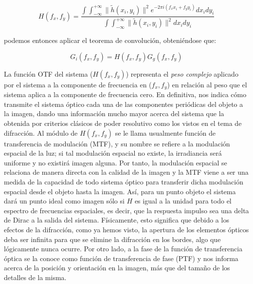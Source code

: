 \documentclass[12pt,a4paper]{report}
\newcommand{\esp}{\vspace{0.5cm}}
\begin{document}
	\esp
	
	\begin{equation}
		H(f_x, f_y) = \frac{\int \int_{-\infty}^{+\infty} \|\tilde{h}(x_i, y_i)\|^2 e^{-2\pi i (f_x x_i + f_y y_i)} dx_i dy_i}{\int \int_{-\infty}^{+\infty} \|\tilde{h}(x_i, y_i)\|^2 dx_i dy_i} \tag{5.52}
	\end{equation}
	
	\esp
	
	podemos entonces aplicar el teorema de convolución, obteniéndose que:
	
	\esp
	
	\begin{equation}
		G_i(f_x, f_y) = H(f_x, f_y) G_g(f_x, f_y)
	\end{equation}
	
	\esp
	
	La función OTF del sistema ($H(f_x, f_y)$) representa el \textit{peso complejo} aplicado por el sistema a la componente de frecuencia en ($f_x, f_y$) en relación al peso que el sistema aplica a la componente de frecuencia cero. En definitiva, nos indica cómo transmite el sistema óptico cada una de las componentes periódicas del objeto a la imagen, dando una información mucho mayor acerca del sistema que la obtenida por criterios clásicos de poder resolutivo como los vistos en el tema de difracción. Al módulo de $H(f_x, f_y)$ se le llama usualmente función de transferencia de modulación (MTF), y su nombre se refiere a la modulación espacial de la luz; si tal modulación espacial no existe, la irradiancia será uniforme y no existirá imagen alguna. Por tanto, la modulación espacial se relaciona de manera directa con la calidad de la imagen y la MTF viene a ser una medida de la capacidad de todo sistema óptico para transferir dicha modulación espacial desde el objeto hasta la imagen. Así, para un punto objeto el sistema dará un punto ideal como imagen sólo si $H$ es igual a la unidad para todo el espectro de frecuencias espaciales, es decir, que la respuesta impulso sea una delta de Dirac a la salida del sistema. Físicamente, esto significa que debido a los efectos de la difracción, como ya hemos visto, la apertura de los elementos ópticos deba ser infinita para que se elimine la difracción en los bordes, algo que lógicamente nunca ocurre. Por otro lado, a la fase de la función de transferencia óptica se la conoce como función de transferencia de fase (PTF) y nos informa acerca de la posición y orientación en la imagen, más que del tamaño de los detalles de la misma.
	
	\esp
	
\end{document}
